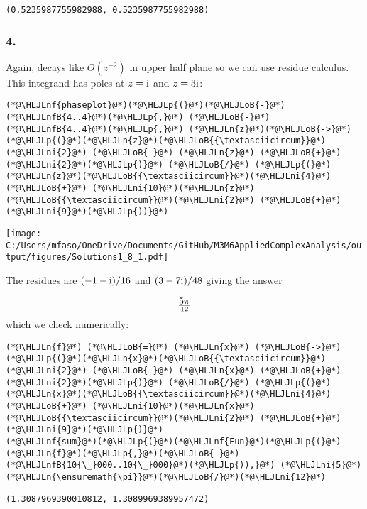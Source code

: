 \documentclass[12pt,a4paper]{article}
\newcommand{\HLJLn}[1]{#1}
\newcommand{\HLJLnf}[1]{\textcolor[RGB]{66,102,213}{#1}}
\newcommand{\HLJLnfB}[1]{\textcolor[RGB]{59,151,46}{#1}}
\newcommand{\HLJLni}[1]{\textcolor[RGB]{59,151,46}{#1}}
\newcommand{\HLJLoB}[1]{\textcolor[RGB]{102,102,102}{\textbf{#1}}}
\newcommand{\HLJLp}[1]{#1}
\def\I{ {\rm i} }
\begin{document}
\begin{lstlisting}
(0.5235987755982988, 0.5235987755982988)
\end{lstlisting}


\subsubsection{4.}
Again, decays like $O(z^{-2})$ in upper half plane so we can use residue calculus. This integrand has poles at $z = \I$ and $z = 3 \I$:


\begin{lstlisting}
(*@\HLJLnf{phaseplot}@*)(*@\HLJLp{(}@*)(*@\HLJLoB{-}@*)(*@\HLJLnfB{4..4}@*)(*@\HLJLp{,}@*) (*@\HLJLoB{-}@*)(*@\HLJLnfB{4..4}@*)(*@\HLJLp{,}@*) (*@\HLJLn{z}@*)(*@\HLJLoB{->}@*) (*@\HLJLp{(}@*)(*@\HLJLn{z}@*)(*@\HLJLoB{{\textasciicircum}}@*)(*@\HLJLni{2}@*) (*@\HLJLoB{-}@*) (*@\HLJLn{z}@*) (*@\HLJLoB{+}@*) (*@\HLJLni{2}@*)(*@\HLJLp{)}@*) (*@\HLJLoB{/}@*) (*@\HLJLp{(}@*)(*@\HLJLn{z}@*)(*@\HLJLoB{{\textasciicircum}}@*)(*@\HLJLni{4}@*) (*@\HLJLoB{+}@*) (*@\HLJLni{10}@*)(*@\HLJLn{z}@*)(*@\HLJLoB{{\textasciicircum}}@*)(*@\HLJLni{2}@*) (*@\HLJLoB{+}@*)(*@\HLJLni{9}@*)(*@\HLJLp{))}@*)
\end{lstlisting}

\texttt{[image: C:/Users/mfaso/OneDrive/Documents/GitHub/M3M6AppliedComplexAnalysis/output/figures/Solutions1\_8\_1.pdf]}

The residues are $(-1-\I)/16$ and $(3-7\I)/48$ giving the answer

\[
5\pi \over 12
\]
which we check numerically:


\begin{lstlisting}
(*@\HLJLn{f}@*) (*@\HLJLoB{=}@*) (*@\HLJLn{x}@*) (*@\HLJLoB{->}@*) (*@\HLJLp{(}@*)(*@\HLJLn{x}@*)(*@\HLJLoB{{\textasciicircum}}@*)(*@\HLJLni{2}@*) (*@\HLJLoB{-}@*) (*@\HLJLn{x}@*) (*@\HLJLoB{+}@*) (*@\HLJLni{2}@*)(*@\HLJLp{)}@*) (*@\HLJLoB{/}@*) (*@\HLJLp{(}@*)(*@\HLJLn{x}@*)(*@\HLJLoB{{\textasciicircum}}@*)(*@\HLJLni{4}@*) (*@\HLJLoB{+}@*) (*@\HLJLni{10}@*)(*@\HLJLn{x}@*)(*@\HLJLoB{{\textasciicircum}}@*)(*@\HLJLni{2}@*) (*@\HLJLoB{+}@*)(*@\HLJLni{9}@*)(*@\HLJLp{)}@*)
(*@\HLJLnf{sum}@*)(*@\HLJLp{(}@*)(*@\HLJLnf{Fun}@*)(*@\HLJLp{(}@*)(*@\HLJLn{f}@*)(*@\HLJLp{,}@*)(*@\HLJLoB{-}@*)(*@\HLJLnfB{10{\_}000..10{\_}000}@*)(*@\HLJLp{)),}@*) (*@\HLJLni{5}@*)(*@\HLJLn{\ensuremath{\pi}}@*)(*@\HLJLoB{/}@*)(*@\HLJLni{12}@*)
\end{lstlisting}

\begin{lstlisting}
(1.3087969390010812, 1.3089969389957472)
\end{lstlisting}
\end{document}
